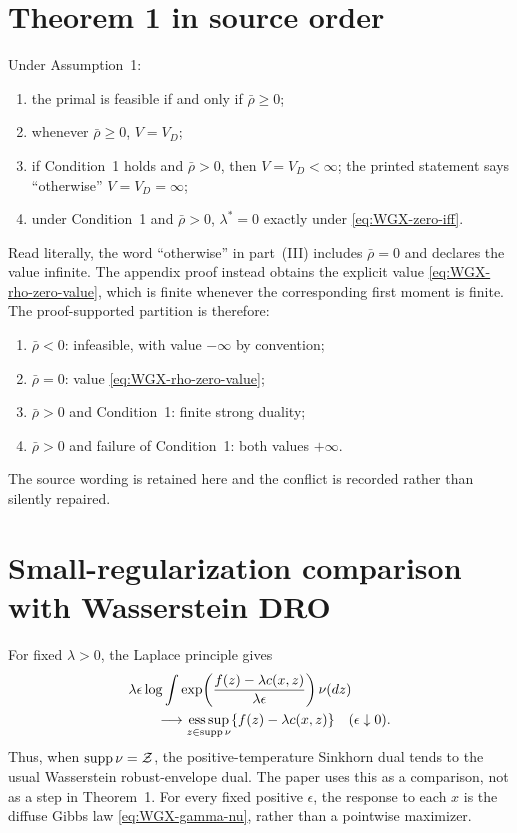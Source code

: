 \section{Theorem 1 in source order}
\begin{theorem}\label{thm:WGX-main}
Under Assumption~1:
\begin{enumerate}[label=(\roman*),leftmargin=2em]
\item the primal is feasible if and only if $\bar\rho\ge0$;
\item whenever $\bar\rho\ge0$, $V=V_D$;
\item if Condition~1 holds and $\bar\rho>0$, then $V=V_D<\infty$; the printed statement says ``otherwise'' $V=V_D=\infty$;
\item under Condition~1 and $\bar\rho>0$, $\lambda^*=0$ exactly under \eqref{eq:WGX-zero-iff}.
\end{enumerate}
\end{theorem}

\begin{remark}
Read literally, the word ``otherwise'' in part~(III) includes $\bar\rho=0$ and declares the value infinite.  The appendix proof instead obtains the explicit value \eqref{eq:WGX-rho-zero-value}, which is finite whenever the corresponding first moment is finite.  The proof-supported partition is therefore:
\begin{enumerate}[label=(\alph*),leftmargin=2em]
\item $\bar\rho<0$: infeasible, with value $-\infty$ by convention;
\item $\bar\rho=0$: value \eqref{eq:WGX-rho-zero-value};
\item $\bar\rho>0$ and Condition~1: finite strong duality;
\item $\bar\rho>0$ and failure of Condition~1: both values $+\infty$.
\end{enumerate}
The source wording is retained here and the conflict is recorded rather than silently repaired.
\end{remark}

\section{Small-regularization comparison with Wasserstein DRO}
For fixed $\lambda>0$, the Laplace principle gives
\begin{align}
 &\lambda\epsilon\log\int
 \exp\!\left(
 \frac{f(z)-\lambda c(x,z)}{\lambda\epsilon}
 \right)\nu(dz)\notag\\
 &\qquad\longrightarrow
 \operatorname*{ess\,sup}_{z\in\operatorname{supp}\nu}
 \{f(z)-\lambda c(x,z)\}
 \quad(\epsilon\downarrow0).\label{eq:WGX-small-eps}
\end{align}
Thus, when $\operatorname{supp}\nu=\mathcal Z$, the positive-temperature Sinkhorn dual tends to the usual Wasserstein robust-envelope dual.  The paper uses this as a comparison, not as a step in Theorem~1.  For every fixed positive $\epsilon$, the response to each $x$ is the diffuse Gibbs law \eqref{eq:WGX-gamma-nu}, rather than a pointwise maximizer.

